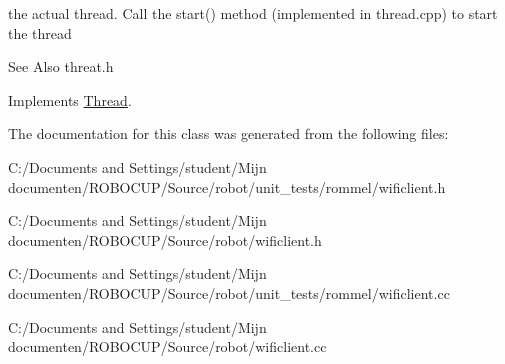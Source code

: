 the actual thread. Call the start() method (implemented in thread.\-cpp) to start the thread 

\begin{DoxySeeAlso}{See Also}
threat.\-h 
\end{DoxySeeAlso}


Implements \hyperlink{class_thread}{Thread}.



The documentation for this class was generated from the following files\-:\begin{DoxyCompactItemize}
\item 
C\-:/\-Documents and Settings/student/\-Mijn documenten/\-R\-O\-B\-O\-C\-U\-P/\-Source/robot/unit\-\_\-tests/rommel/wificlient.\-h\item 
C\-:/\-Documents and Settings/student/\-Mijn documenten/\-R\-O\-B\-O\-C\-U\-P/\-Source/robot/wificlient.\-h\item 
C\-:/\-Documents and Settings/student/\-Mijn documenten/\-R\-O\-B\-O\-C\-U\-P/\-Source/robot/unit\-\_\-tests/rommel/wificlient.\-cc\item 
C\-:/\-Documents and Settings/student/\-Mijn documenten/\-R\-O\-B\-O\-C\-U\-P/\-Source/robot/wificlient.\-cc\end{DoxyCompactItemize}
